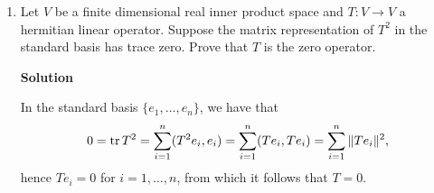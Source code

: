 \documentclass{article}
\def\tr{\mathop{\rm tr}\nolimits}
\begin{document}
\begin{enumerate}
{\bf Solution}

Let \(\lambda_i\), \(i = 1,2,3\) be the roots of the characteristic polynomial.  Then \(\lambda_1 \lambda_2 \lambda_3 = \det A = 1\), hence at least one of the \(\lambda_i\)'s is real.  Without loss of generality, suppose \(\lambda_1 \in \mathbb{R}\).

Let \(x_i\) be an associated eigenvector for \(\lambda_i\).  Then
\[(x_i, x_i) = (A^tAx_i, x_i)
             = (Ax_i, Ax_i)
             = (\lambda_i x_i, \lambda_i x_i)
             = |\lambda_i|^2 (x_i, x_i),\]
so \(|\lambda_i|^2 = 1\), hence \(|\lambda_i| = 1\).

Now if \(\lambda_2 \notin \mathbb{R}\), then \(\lambda_3 = \overline{\lambda_2}\) and
\[1 = \lambda_1 \lambda_2 \lambda_3
    = \lambda_1 \lambda_2 \overline{\lambda_2}
    = \lambda_1 |\lambda_2|^2
    = \lambda_1,\]
which proves the claim.  On the other hand, if \(\lambda_2 \in \mathbb{R}\), \(\lambda_3 \in \mathbb{R}\) as well, hence \(\lambda_i \in \{-1,1\}\) and either \(1\) or \(3\) of the \(\lambda_i\)'s will be equal to \(1\) (since their product is \(1\)).



\item Let \(V\) be a finite dimensional real inner product space and \(T : V \to V\) a hermitian linear operator.  Suppose the matrix representation of \(T^2\) in the standard basis has trace zero.  Prove that \(T\) is the zero operator.

{\bf Solution}

In the standard basis \(\{e_1, \ldots, e_n\}\), we have that
\[0 = \tr T^2 = \sum_{i = 1}^n (T^2 e_i, e_i)
              = \sum_{i = 1}^n (Te_i, Te_i)
              = \sum_{i = 1}^n \|Te_i\|^2,\]
hence \(Te_i = 0\) for \(i = 1, \ldots, n\), from which it follows that \(T = 0\).


\end{enumerate}
\end{document}
